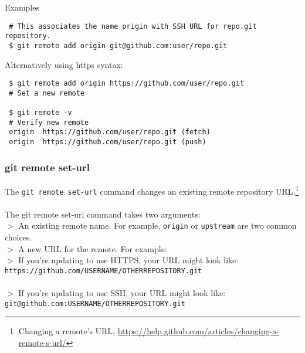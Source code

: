 \documentclass[12pt,letterpaper,dvips]{article}
\newcommand{\cmd}[1]{\texttt{#1}}
\begin{document}
\vspace{10pt}
\noindent \begin{bf}Examples\end{bf}
\begin{Verbatim}
 # This associates the name origin with SSH URL for repo.git repository.
 $ git remote add origin git@github.com:user/repo.git
\end{Verbatim}

\noindent Alternatively using https syntax:

\begin{Verbatim}
 $ git remote add origin https://github.com/user/repo.git
 # Set a new remote

 $ git remote -v
 # Verify new remote
 origin  https://github.com/user/repo.git (fetch)
 origin  https://github.com/user/repo.git (push)
\end{Verbatim}


\newpage
\subsubsection{git remote set-url}
The \cmd{git remote set-url} command changes an existing remote
repository URL.\footnote{Changing a remote's URL,
\href{https://help.github.com/articles/changing-a-remote-s-url/}{https://help.github.com/articles/changing-a-remote-s-url/}}
\\
\\
The git remote set-url command takes two arguments:
\\
$>$ An existing remote name. For example, \cmd{origin} or \cmd{upstream} are two common choices.\\
$>$ A new URL for the remote. For example:\\

\noindent\hspace*{10pt}$>$ If you're updating to use HTTPS, your URL might look like:\\
\noindent\hspace*{23pt}\cmd{https://github.com/USERNAME/OTHERREPOSITORY.git}\\
\\
\noindent\hspace*{10pt}$>$ If you're updating to use SSH, your URL might look like:\\
\noindent\hspace*{23pt}\cmd{git@github.com:USERNAME/OTHERREPOSITORY.git}
\end{document}
